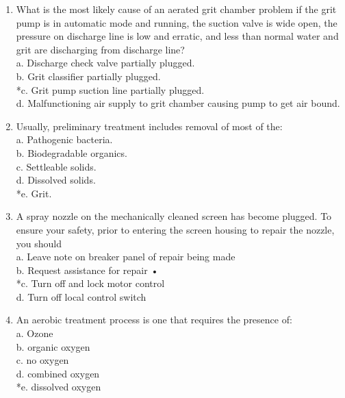 \begin{enumerate}
\vspace{0.4cm}
\item  What is the most likely cause of an aerated grit chamber problem if the grit pump is in automatic mode and running, the suction valve is wide open, the pressure on discharge line is low and erratic, and less than normal water and grit are discharging from discharge line? \\

a. Discharge check valve partially plugged. \\
b. Grit classifier partially plugged. \\
*c. Grit pump suction line partially plugged. \\
d. Malfunctioning air supply to grit chamber causing pump to get air bound. 

\vspace{0.4cm}
\item  Usually, preliminary treatment includes removal of most of the: \\

a. Pathogenic bacteria. \\
b. Biodegradable organics. \\
c. Settleable solids. \\
d. Dissolved solids. \\
*e. Grit. 

\vspace{0.4cm}
\item  A spray nozzle on the mechanically cleaned screen has become plugged. To ensure your safety, prior to entering the screen housing to repair the nozzle, you should \\

a. Leave note on breaker panel of repair being made \\
b. Request assistance for repair • \\
*c. Turn off and lock motor control \\
d. Turn off local control switch 

\vspace{0.4cm}
\item  An aerobic treatment process is one that requires the presence of: \\

a. Ozone \\
b. organic oxygen \\
c. no oxygen \\
d. combined oxygen \\
*e. dissolved oxygen 


\end{enumerate}
